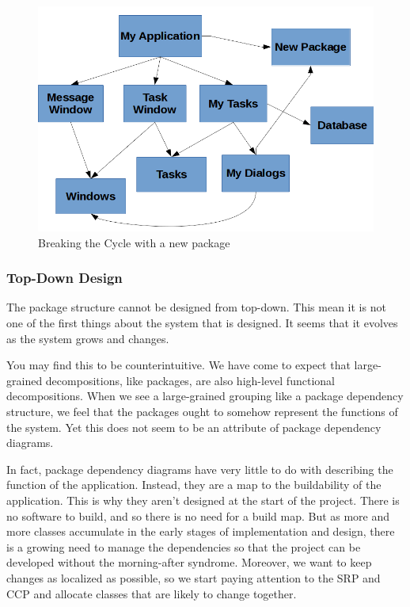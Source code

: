 \documentclass[12pt]{report}
\begin{document}
\begin{figure}[H]
    \centering
    \includegraphics[width=\textwidth]{uml/new-package.png}
    \caption{Breaking the Cycle with a new package}
    \label{new-package}
\end{figure}

\subsubsection{Top-Down Design}
The package structure cannot be designed from top-down. This mean it is not one of the first things about the system that is designed. 
It seems that it evolves as the system grows and changes. 

You may find this to be counterintuitive. 
We have come to expect that large-grained decompositions, 
like packages, are also high-level functional decompositions. 
When we see a large-grained grouping like a package
dependency structure, 
we feel that the packages ought to somehow represent the functions 
of the system. Yet this does not seem to be an attribute of package dependency diagrams.

In fact, package dependency diagrams have very little 
to do with describing the function of the application.
Instead, they are a map to the buildability of the application. 
This is why they aren't designed at the start of the project. 
There is no software to build, and so there is no need for a build map. 
But as more and more classes accumulate in the 
early stages of implementation and design, 
there is a growing need to manage the dependencies so that 
the project can be developed without the morning-after syndrome. 
Moreover, we want to keep changes as localized as possible, 
so we start paying attention to the SRP and CCP and 
allocate classes that are likely to change together.
\end{document}
